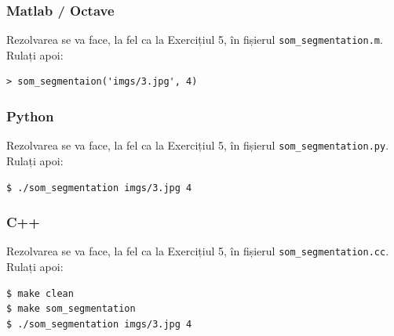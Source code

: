 \documentclass[12pt]{article}%
\newcommand{\mat}{{\color{brightmaroon} Matlab / Octave}}
\newcommand{\pyt}{{\color{cadmiumgreen} Python}}
\newcommand{\cc}{{\color{cobalt} C++}}
\begin{document}
\subsubsection*{\mat}
\label{sec:mat6}

Rezolvarea se va face, la fel ca la Exercițiul 5, în fișierul
\texttt{som\_segmentation.m}. Rulați apoi:
\begin{verbatim}
> som_segmentaion('imgs/3.jpg', 4)
\end{verbatim}

\subsubsection*{\pyt}
\label{sec:py6}

Rezolvarea se va face, la fel ca la Exercițiul 5, în fișierul
\texttt{som\_segmentation.py}. Rulați apoi:
\begin{verbatim}
$ ./som_segmentation imgs/3.jpg 4
\end{verbatim}

\subsubsection*{\cc}
\label{sec:cc6}

Rezolvarea se va face, la fel ca la Exercițiul 5, în fișierul
\texttt{som\_segmentation.cc}. Rulați apoi:
\begin{verbatim}
$ make clean
$ make som_segmentation
$ ./som_segmentation imgs/3.jpg 4
\end{verbatim}
\end{document}
